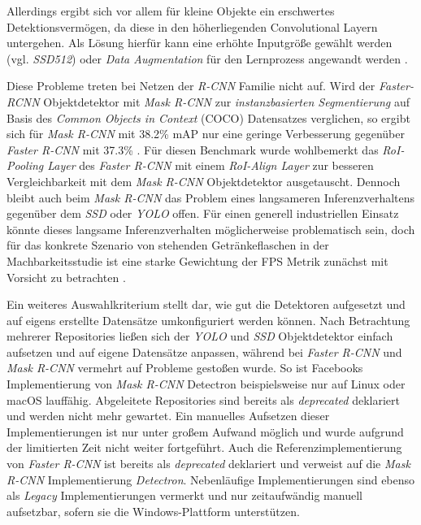 Allerdings ergibt sich vor allem für kleine Objekte ein erschwertes Detektionsvermögen, da diese in den höherliegenden Convolutional Layern untergehen. Als Lösung hierfür kann eine erhöhte Inputgröße gewählt werden (vgl. \textit{SSD512}) oder \textit{Data Augmentation} für den Lernprozess angewandt werden \cite{ssd.20161229}.

Diese Probleme treten bei Netzen der \textit{R-CNN} Familie nicht auf. Wird der \textit{Faster-RCNN} Objektdetektor mit \textit{Mask R-CNN} zur \textit{instanzbasierten Segmentierung} auf Basis des \textit{Common Objects in Context} (COCO) Datensatzes verglichen, so ergibt sich für \textit{Mask R-CNN} mit 38.2\% mAP nur eine geringe Verbesserung gegenüber \textit{Faster R-CNN} mit 37.3\% \cite{KaimingHeGeorgiaGkioxariPiotrDollarRossGirshick.20180224}. Für diesen Benchmark wurde wohlbemerkt das \textit{RoI-Pooling Layer} des \textit{Faster R-CNN} mit einem \textit{RoI-Align Layer} zur besseren Vergleichbarkeit mit dem \textit{Mask R-CNN} Objektdetektor ausgetauscht. Dennoch bleibt auch beim \textit{Mask R-CNN} das Problem eines langsameren Inferenzverhaltens gegenüber dem \textit{SSD} oder \textit{YOLO} offen. Für einen generell industriellen Einsatz könnte dieses langsame Inferenzverhalten möglicherweise problematisch sein, doch für das konkrete Szenario von stehenden Getränkeflaschen in der Machbarkeitsstudie ist eine starke Gewichtung der FPS Metrik zunächst mit Vorsicht zu betrachten \cite{IntanPurnamasar.20181215}. 

Ein weiteres Auswahlkriterium stellt dar, wie gut die Detektoren aufgesetzt und auf eigens erstellte Datensätze umkonfiguriert werden können. Nach Betrachtung mehrerer Repositories ließen sich der \textit{YOLO} und \textit{SSD} Objektdetektor einfach aufsetzen und auf eigene Datensätze anpassen, während bei \textit{Faster R-CNN} und \textit{Mask R-CNN} vermehrt auf Probleme gestoßen wurde. So ist Facebooks Implementierung von \textit{Mask R-CNN} \glqq Detectron\grqq{} beispielsweise nur auf Linux oder macOS lauffähig. Abgeleitete Repositories sind bereits als \textit{deprecated} deklariert und werden nicht mehr gewartet. Ein manuelles Aufsetzen dieser Implementierungen ist nur unter großem Aufwand möglich und wurde aufgrund der limitierten Zeit nicht weiter fortgeführt. Auch die Referenzimplementierung von \textit{Faster R-CNN} ist bereits als \textit{deprecated} deklariert und verweist auf die \textit{Mask R-CNN} Implementierung \textit{Detectron}. Nebenläufige Implementierungen sind ebenso als \textit{Legacy} Implementierungen vermerkt und nur zeitaufwändig manuell aufsetzbar, sofern sie die Windows-Plattform unterstützen.

